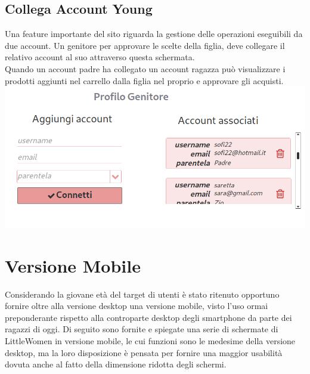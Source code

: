 \documentclass[12pt,a4paper]{report}
\begin{document}
 \subsection{Collega Account Young}
 Una feature importante del sito riguarda la gestione delle operazioni eseguibili da due account. Un genitore per approvare le scelte della figlia, deve collegare il relativo account al suo attraverso questa schermata.\\
 Quando un account padre ha collegato un account ragazza può visualizzare i prodotti aggiunti nel carrello dalla figlia nel proprio e approvare gli acquisti.\\
 \includegraphics[width=\textwidth]{"Images Latex/Immagini Wireframe/Desktop/19 - Profilo Collega Account"}
\section{Versione Mobile}
Considerando la giovane età del target di utenti è stato ritenuto opportuno fornire oltre alla versione desktop una versione mobile, visto l'uso ormai preponderante rispetto alla controparte desktop degli smartphone da parte dei ragazzi di oggi. Di seguito sono fornite e spiegate una serie di schermate di LittleWomen in versione mobile, le cui funzioni sono le medesime della versione desktop, ma la loro disposizione è pensata per fornire una maggior usabilità dovuta anche al fatto della dimensione ridotta degli schermi.
\newpage
\end{document}
